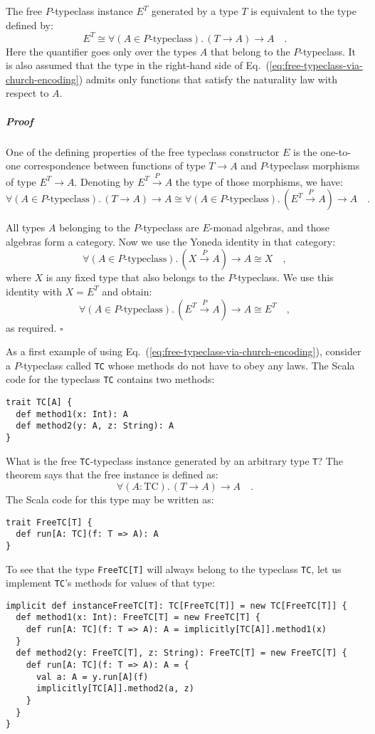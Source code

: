 The free $P$-typeclass instance $E^{T}$ generated by a type $T$
is equivalent to the type defined by:
\begin{equation}
E^{T}\cong\forall(A\in P\text{-typeclass}).\,(T\rightarrow A)\rightarrow A\quad.\label{eq:free-typeclass-via-church-encoding}
\end{equation}
Here the quantifier goes only over the types $A$ that belong to the
$P$-typeclass. It is also assumed that the type in the right-hand
side of Eq.~(\ref{eq:free-typeclass-via-church-encoding}) admits
only functions that satisfy the naturality law with respect to $A$.

\subparagraph{Proof}

One of the defining properties of the free typeclass constructor $E$
is the one-to-one correspondence between functions of type $T\rightarrow A$
and $P$-typeclass morphisms of type $E^{T}\rightarrow A$. Denoting
by $E^{T}\overset{P}{\rightarrow}A$ the type of those morphisms,
we have:
\[
\forall(A\in P\text{-typeclass}).\,(T\rightarrow A)\rightarrow A\cong\forall(A\in P\text{-typeclass}).\,(E^{T}\overset{P}{\rightarrow}A)\rightarrow A\quad.
\]

All types $A$ belonging to the $P$-typeclass are $E$-monad algebras,
and those algebras form a category. Now we use the Yoneda identity
in that category:
\[
\forall(A\in P\text{-typeclass}).\,(X\overset{P}{\rightarrow}A)\rightarrow A\cong X\quad,
\]
where $X$ is any fixed type that also belongs to the $P$-typeclass.
We use this identity with $X=E^{T}$ and obtain:
\[
\forall(A\in P\text{-typeclass}).\,(E^{T}\overset{P}{\rightarrow}A)\rightarrow A\cong E^{T}\quad,
\]
as required. $\square$

As a first example of using Eq.~(\ref{eq:free-typeclass-via-church-encoding}),
consider a $P$-typeclass called \lstinline!TC! whose methods do
not have to obey any laws. The Scala code for the typeclass \lstinline!TC!
contains two methods:
\begin{lstlisting}
trait TC[A] {
  def method1(x: Int): A
  def method2(y: A, z: String): A
}
\end{lstlisting}
What is the free \lstinline!TC!-typeclass instance generated by an
arbitrary type \lstinline!T!? The theorem says that the free instance
is defined as:
\[
\forall(A:\text{TC}).\,(T\rightarrow A)\rightarrow A\quad.
\]
The Scala code for this type may be written as:
\begin{lstlisting}
trait FreeTC[T] {
  def run[A: TC](f: T => A): A
}
\end{lstlisting}
To see that the type \lstinline!FreeTC[T]! will always belong to
the typeclass \lstinline!TC!, let us implement \lstinline!TC!\textsf{'}s
methods for values of that type:
\begin{lstlisting}
implicit def instanceFreeTC[T]: TC[FreeTC[T]] = new TC[FreeTC[T]] {
  def method1(x: Int): FreeTC[T] = new FreeTC[T] {
    def run[A: TC](f: T => A): A = implicitly[TC[A]].method1(x)
  }
  def method2(y: FreeTC[T], z: String): FreeTC[T] = new FreeTC[T] {
    def run[A: TC](f: T => A): A = {
      val a: A = y.run[A](f)
      implicitly[TC[A]].method2(a, z)
    }
  }
}
\end{lstlisting}

